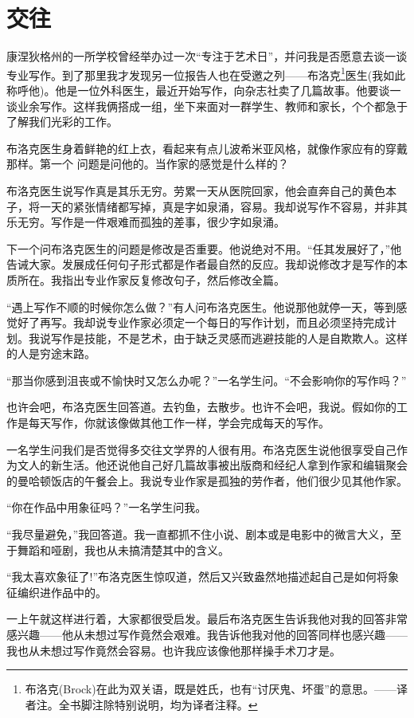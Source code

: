 \chapter{交往}
康涅狄格州的一所学校曾经举办过一次“专注于艺术日”，并问我是否愿意去谈一谈专业写作。到了那里我才发现另一位报告人也在受邀之列——布洛克\footnote{布洛克(Brock)在此为双关语，既是姓氏，也有“讨厌鬼、坏蛋”的意思。——译者注。全书脚注除特别说明，均为译者注释。}医生(我如此称呼他)。他是一位外科医生，最近开始写作，向杂志社卖了几篇故事。他要谈一谈业余写作。这样我俩搭成一组，坐下来面对一群学生、教师和家长，个个都急于了解我们光彩的工作。

布洛克医生身着鲜艳的红上衣，看起来有点儿波希米亚风格，就像作家应有的穿戴那样。第一个 问题是问他的。当作家的感觉是什么样的？

布洛克医生说写作真是其乐无穷。劳累一天从医院回家，他会直奔自己的黄色本子，将一天的紧张情绪都写掉，真是字如泉涌，容易。我却说写作不容易，并非其乐无穷。写作是一件艰难而孤独的差事，很少字如泉涌。

下一个问布洛克医生的问题是修改是否重要。他说绝对不用。“任其发展好了，”他告诫大家。发展成任何句子形式都是作者最自然的反应。我却说修改才是写作的本质所在。我指出专业作家反复修改句子，然后修改全篇。

“遇上写作不顺的时候你怎么做？”有人问布洛克医生。他说那他就停一天，等到感觉好了再写。我却说专业作家必须定一个每日的写作计划，而且必须坚持完成计划。我说写作是技能，不是艺术，由于缺乏灵感而逃避技能的人是自欺欺人。这样的人是穷途末路。

“那当你感到沮丧或不愉快时又怎么办呢？”一名学生问。“不会影响你的写作吗？”

也许会吧，布洛克医生回答道。去钓鱼，去散步。也许不会吧，我说。假如你的工作是每天写作，你就该像做其他工作一样，学会完成每天的写作。

一名学生问我们是否觉得多交往文学界的人很有用。布洛克医生说他很享受自己作为文人的新生活。他还说他自己好几篇故事被出版商和经纪人拿到作家和编辑聚会的曼哈顿饭店的午餐会上。我说专业作家是孤独的劳作者，他们很少见其他作家。

“你在作品中用象征吗？”一名学生问我。

“我尽量避免，”我回答道。我一直都抓不住小说、剧本或是电影中的微言大义，至于舞蹈和哑剧，我也从未搞清楚其中的含义。

“我太喜欢象征了!”布洛克医生惊叹道，然后又兴致盎然地描述起自己是如何将象征编织进作品中的。

一上午就这样进行着，大家都很受启发。最后布洛克医生告诉我他对我的回答非常感兴趣——他从未想过写作竟然会艰难。我告诉他我对他的回答同样也感兴趣——我也从未想过写作竟然会容易。也许我应该像他那样操手术刀才是。

